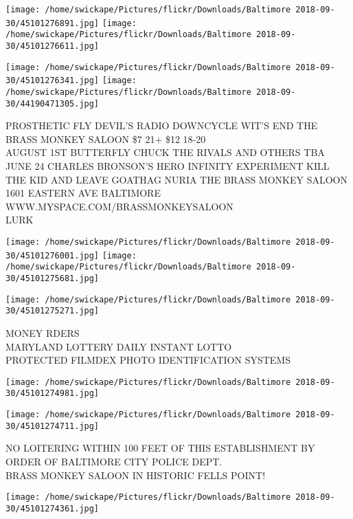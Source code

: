 \documentclass[10pt,letterpaper]{article}
\begin{document}
\texttt{[image: /home/swickape/Pictures/flickr/Downloads/Baltimore 2018-09-30/45101276891.jpg]}
\texttt{[image: /home/swickape/Pictures/flickr/Downloads/Baltimore 2018-09-30/45101276611.jpg]}

\texttt{[image: /home/swickape/Pictures/flickr/Downloads/Baltimore 2018-09-30/45101276341.jpg]}
\texttt{[image: /home/swickape/Pictures/flickr/Downloads/Baltimore 2018-09-30/44190471305.jpg]}

PROSTHETIC FLY DEVIL'S RADIO DOWNCYCLE WIT'S END THE BRASS MONKEY SALOON \$7 21+ \$12 18{-}20\\
AUGUST 1ST BUTTERFLY CHUCK THE RIVALS AND OTHERS TBA\\
JUNE 24 CHARLES BRONSON'S HERO INFINITY EXPERIMENT KILL THE KID AND LEAVE GOATHAG NURIA THE BRASS MONKEY SALOON 1601 EASTERN AVE BALTIMORE WWW.MYSPACE.COM/BRASSMONKEYSALOON\\
LURK\\
\pagebreak

\texttt{[image: /home/swickape/Pictures/flickr/Downloads/Baltimore 2018-09-30/45101276001.jpg]}
\texttt{[image: /home/swickape/Pictures/flickr/Downloads/Baltimore 2018-09-30/45101275681.jpg]}

\vspace{0.25in}
\texttt{[image: /home/swickape/Pictures/flickr/Downloads/Baltimore 2018-09-30/45101275271.jpg]}

MONEY RDERS\\
MARYLAND LOTTERY DAILY INSTANT LOTTO\\
PROTECTED FILMDEX PHOTO IDENTIFICATION SYSTEMS\\
\pagebreak

\texttt{[image: /home/swickape/Pictures/flickr/Downloads/Baltimore 2018-09-30/45101274981.jpg]}

\vspace{0.25in}
\texttt{[image: /home/swickape/Pictures/flickr/Downloads/Baltimore 2018-09-30/45101274711.jpg]}

NO LOITERING WITHIN 100 FEET OF THIS ESTABLISHMENT BY ORDER OF BALTIMORE CITY POLICE DEPT.\\
BRASS MONKEY SALOON IN HISTORIC FELLS POINT!\\
\pagebreak

\texttt{[image: /home/swickape/Pictures/flickr/Downloads/Baltimore 2018-09-30/45101274361.jpg]}
\end{document}
